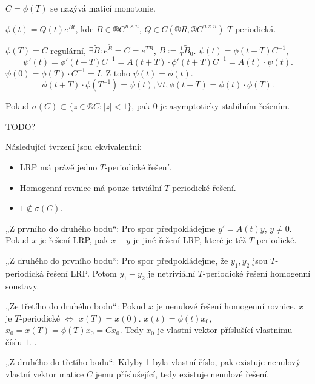 \documentclass[12pt]{article}					%
\begin{document}
\begin{definice}
	$C = \phi(T)$ se nazývá maticí monotonie.
\end{definice}

\begin{veta}
	$\phi(t) = Q(t) e^{B t}$, kde $B \in ®C^{n \times n}$, $Q \in C(®R, ®C^{n \times n})$ $T$-periodická.

	\begin{dukazin}
		$\phi(T) = C$ regulární, $\exists \tilde B: e^{\tilde B} = C = e^{T B}$, $B := \frac{1}{T} \tilde B_0$. $\psi(t) = \phi(t + T)C^{-1}$,
		$$ \psi'(t) = \phi'(t + T)C^{-1} = A(t + T)·\phi'(t + T) C^{-1} = A(t)·\psi(t). $$
		$\psi(0) = \phi(T)·C^{-1} = I$. Z toho $\psi(t) = \phi(t)$.
		$$ \phi(t + T)·\phi(T^{-1}) = \psi(t), \forall t, \phi(t + T) = \phi(t)·\phi(T). $$
	\end{dukazin}
\end{veta}

\begin{tvrzeni}
	Pokud $\sigma(C) \subset \{z \in ®C: |z| < 1\}$, pak $0$ je asymptoticky stabilním řešením.

	\begin{dukazin}
		TODO?
	\end{dukazin}
\end{tvrzeni}

\begin{veta}
	Následující tvrzení jsou ekvivalentní:

	\begin{itemize}
		\item LRP má právě jedno $T$-periodické řešení.
		\item Homogenní rovnice má pouze triviální $T$-periodické řešení.
		\item $1 \notin \sigma(C)$.
	\end{itemize}

	\begin{dukazin}
		„Z prvního do druhého bodu“: Pro spor předpokládejme $y' = A(t)y$, $y ≠ 0$. Pokud $x$ je řešení LRP, pak $x + y$ je jiné řešení LRP, které je též $T$-periodické.

		„Z druhého do prvního bodu“: Pro spor předpokládejme, že $y_1, y_2$ jsou $T$-periodická řešení LRP. Potom $y_1 - y_2$ je netriviální $T$-periodické řešení homogenní soustavy.

		„Ze třetího do druhého bodu“: Pokud $x$ je nenulové řešení homogenní rovnice. $x$ je $T$-periodické $\Leftrightarrow$ $x(T) = x(0)$. $x(t) = \phi(t) x_0$, $x_0 = x(T) = \phi(T)x_0 = Cx_0$. Tedy $x_0$ je vlastní vektor příslušící vlastnímu číslu $1$. \lightning.

		„Z druhého do třetího bodu“: Kdyby 1 byla vlastní číslo, pak existuje nenulový vlastní vektor matice $C$ jemu příslušející, tedy existuje nenulové řešení.
	\end{dukazin}
\end{veta}
\end{document}
